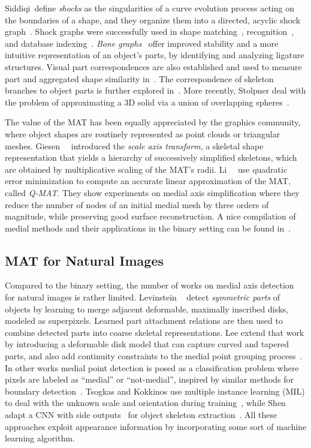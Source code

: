 \documentclass[10pt,twocolumn,letterpaper]{article}
\begin{document}
Siddiqi~\etal define \emph{shocks} as the singularities of a curve evolution process acting on the boundaries of
a shape, and they organize them into a directed, acyclic shock graph~\cite{siddiqi1999shock}.
Shock graphs were successfully used in shape matching~\cite{siddiqi1999shock}, recognition~\cite{sebastian2001recognition},
and database indexing~\cite{sebastian2002shock}.
\emph{Bone graphs}~\cite{macrini2008skeletons} offer improved stability and a more intuitive representation of an object's parts, 
by identifying and analyzing ligature structures.
Visual part correspondences are also established and used to measure part and aggregated shape similarity in~\cite{latecki2000shape}.
The correspondence of skeleton branches to object parts is further explored in~\cite{ling2007shape,bai2008path}.
More recently, Stolpner \etal deal with the problem of approximating a 3D solid via a union
of overlapping spheres~\cite{stolpner2012medial}.

The value of the MAT has been equally appreciated by the graphics community, where object shapes 
are routinely represented as point clouds or triangular meshes.
Giesen~\etal~\cite{giesen2009scale} introduced the \emph{scale axis transform}, a skeletal shape representation
that yields a hierarchy of successively simplified skeletons, which are obtained by multiplicative scaling of the
MAT's radii.
Li~\etal~\cite{li2015q} use quadratic error minimization to compute an accurate linear approximation of the MAT, called \emph{Q-MAT}.
They show experiments on medial axis simplification where they reduce the number of nodes of an initial medial mesh
by three orders of magnitude, while preserving good surface reconstruction.
A nice compilation of medial methods and their applications in the binary setting can be found in~\cite{siddiqi2008medial}.


\subsection{MAT for Natural Images}\label{sec:related:natural}
Compared to the binary setting, the number of works on medial axis detection for natural images is rather limited.
Levinstein \etal~\cite{levinshtein2009multiscale} detect \emph{symmetric parts} of objects
by learning to merge adjacent deformable, maximally inscribed disks, modeled as superpixels.
Learned part attachment relations are then used to combine detected parts into coarse skeletal representations.
Lee \etal extend that work by introducing a deformable disk model that can capture curved and tapered parts, and also add
continuity constraints to the medial point grouping process~\cite{lee2013detecting}.
In other works medial point detection is posed as a classification problem where pixels are labeled
as ``medial'' or ``not-medial'', inspired by similar methods for boundary detection~\cite{martin2004learning}.
Tsogkas and Kokkinos use multiple instance learning (MIL) to deal with the unknown scale and orientation 
during training~\cite{tsogkas2012learning}, while Shen \etal adapt a CNN with 
side outputs~\cite{xie2015holistically} for object skeleton extraction~\cite{shen2016object}.
All these approaches exploit appearance information by incorporating some sort of machine learning algorithm.
\end{document}
